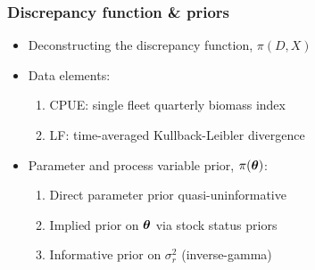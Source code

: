 \documentclass{beamer}
\newcommand{\xtheta}{\mbox{\boldmath$\theta$}}
\newcommand{\sigr}{\sigma^2_r}
\begin{document}
\begin{frame}
    \frametitle{Discrepancy function \& priors}
\begin{itemize}
    \item Deconstructing the discrepancy function, $\pi(D,X)$
    \item Data elements:
        \vspace{0.2cm}
        \begin{enumerate}
            \item CPUE: single fleet quarterly biomass index
            \item LF: time-averaged Kullback-Leibler divergence 
        \end{enumerate}
        \vspace{0.2cm}
    \item Parameter and process variable prior, $\pi(\xtheta)$:
        \vspace{0.2cm} 
        \begin{enumerate}
            \item Direct parameter prior quasi-uninformative
            \item Implied prior on $\xtheta$ via stock status priors
            \item Informative prior on $\sigr$ (inverse-gamma)
        \end{enumerate} 
\end{itemize}
\end{frame}
\end{document}
